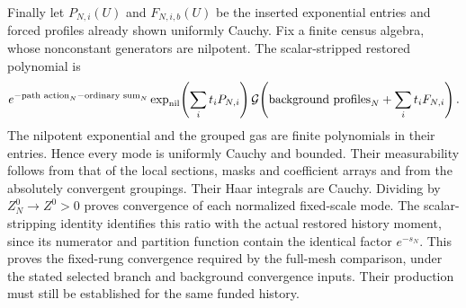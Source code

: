 Finally let $P_{N,i}(U)$ and $F_{N,i,b}(U)$ be the inserted
exponential entries and forced profiles already shown uniformly
Cauchy. Fix a finite census algebra, whose nonconstant generators
are nilpotent. The scalar-stripped restored polynomial is
\[
 e^{-\text{path action}_N-\text{ordinary sum}_N}
 \exp_{\rm nil}\!\left(\sum_i t_iP_{N,i}\right)
 \mathcal G\!\left(\text{background profiles}_N
                                  +\sum_i t_iF_{N,i}\right).
\]
The nilpotent exponential and the grouped gas are finite
polynomials in their entries. Hence every mode is uniformly
Cauchy and bounded. Their measurability follows from that of
the local sections, masks and coefficient arrays and from the
absolutely convergent groupings. Their Haar integrals are Cauchy.
Dividing by $Z_N^0\to Z^0>0$ proves convergence of each normalized
fixed-scale mode. The scalar-stripping identity identifies this
ratio with the actual restored history moment, since its numerator
and partition function contain the identical factor $e^{-s_N}$.
This proves the fixed-rung convergence required by the full-mesh
comparison, under the stated selected branch and background
convergence inputs. Their production must still be established
for the same funded history.
